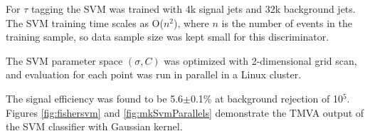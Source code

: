\documentclass[a4paper]{jpconf}
\begin{document}
For $\tau$ tagging the SVM was trained with 4k signal jets and 32k background jets.
The SVM training time  scales as O($n^2$), where $n$ is the number of events in the training sample,
so data sample size was kept small for this discriminator.

The SVM parameter space $(\sigma, C)$
was optimized with 2-dimensional grid scan,  
and evaluation for each point was run in parallel in a Linux cluster.

The signal efficiency was found to be 5.6$\pm$0.1\% at background rejection of 10$^5$.
Figures 
\ref{fig:fishersvm}
 and \ref{fig:mkSvmParallels} demonstrate the TMVA output of the SVM classifier
with Gaussian kernel.


%

 

\end{document}
